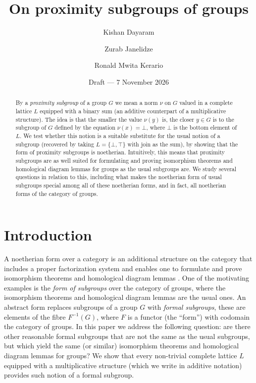 \documentclass[12pt,a4paper]{amsart}
\title[On proximity subgroups of groups]{On proximity subgroups of groups}
\author{Kishan Dayaram}
\author{Zurab Janelidze}
\author{Ronald Mwita Kerario}
\date{Draft --- 7 November 2026}
\theoremstyle{definition}
\begin{document}
\begin{abstract}
By a \emph{proximity subgroup} of a group $G$ we mean a norm $\nu$ on $G$ valued in a complete lattice $L$ equipped with a binary sum (an additive counterpart of a multiplicative structure). The idea is that the smaller the value $\nu(y)$ is, the closer $y\in G$ is to the subgroup of $G$ defined by the equation $\nu(x)=\bot$, where $\bot$ is the bottom element of $L$. We test whether this notion is a suitable substitute for the usual notion of a subgroup (recovered by taking $L=\{\bot,\top\}$ with join as the sum), by showing that the form of proximity subgroups is noetherian. Intuitively, this means that proximity subgroups are as well suited for formulating and proving isomorphism theorems and homological diagram lemmas for groups as the usual subgroups are. We study several questions in relation to this, including what makes the noetherian form of usual subgroups special among all of these noetherian forms, and in fact, all noetherian forms of the category of groups.
\end{abstract}

\maketitle

\section*{Introduction}

A noetherian form over a category is an additional structure on the category that includes a proper factorization system and enables one to formulate and prove isomorphism theorems and homological diagram lemmas 
\cite{GJ,DGJRV}.
One of the motivating examples is the \emph{form of subgroups} over the category of groups, where the isomorphism theorems and homological diagram lemmas are the usual ones. An abstract form replaces subgroups of a group $G$ with \emph{formal subgroups}, these are elements of the fibre $F^{-1}(G)$, where $F$ is a functor (the ``form'') with codomain the category of groups. In this paper we address the following question: are there other reasonable formal subgroups that are not the same as the usual subgroups, but which yield the same (or similar) isomorphism theorems and homological diagram lemmas for groups? We show that every non-trivial complete lattice $L$ equipped with a multiplicative structure (which we write in additive notation) provides such notion of a formal subgroup.   
\end{document}
